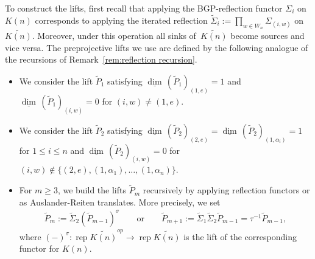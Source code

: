 \documentclass{amsart}
\numberwithin{equation}{section}
\newcommand\udim{{\underline{\dim}\, }}
\newcommand{\rep}{\operatorname{rep}}
\begin{document}
To construct the lifts, first recall that applying the BGP-reflection functor $\Sigma_i$ on $K(n)$ corresponds to applying the iterated reflection $\tilde\Sigma_i:=\prod_{w\in W_n}\Sigma_{(i,w)}$ on $\widetilde{K(n)}$.
Moreover, under this operation all sinks of~$\widetilde{K(n)}$ become sources and vice versa.
The preprojective lifts we use are defined by the following analogue of the recursions of Remark~\ref{rem:reflection recursion}.
\begin{itemize}
  \item We consider the lift $\tilde P_1$ satisfying $\udim(\tilde P_1)_{(1,e)}=1$ and $\udim(\tilde P_1)_{(i,w)}=0$ for $(i,w)\neq (1,e)$.
  \item We consider the lift $\tilde P_2$ satisfying $\udim(\tilde P_2)_{(2,e)}=\udim(\tilde P_2)_{(1,\alpha_i)}=1$ for $1\le i\le n$ and $\udim(\tilde P_2)_{(i,w)}=0$ for $(i,w)\notin\{(2,e),(1,\alpha_1),\ldots,(1,\alpha_n)\}$.
  \item For $m\geq 3$, we build the lifts $\tilde P_m$ recursively by applying reflection functors or as Auslander-Reiten translates.
    More precisely, we set
    \begin{align}
      \label{eq:recursive covers}
      \tilde P_m:=\tilde\Sigma_2(\tilde P_{m-1})^{\sigma}\qquad\text{or}\qquad\tilde P_{m+1}:=\tilde\Sigma_{1}\tilde\Sigma_2\tilde P_{m-1}=\tau^{-1} \tilde P_{m-1},
    \end{align}
    where $(-)^\sigma:\rep\widetilde{K(n)}^{op}\to\rep\widetilde{K(n)}$ is the lift of the corresponding functor for $K(n)$.
\end{itemize}
\end{document}

